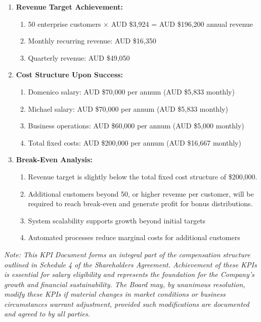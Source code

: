 \begin{enumerate}[label=\arabic*.]
\item \textbf{Revenue Target Achievement:}
    \begin{enumerate}[label=(\alph*)]
    \item 50 enterprise customers × AUD \$3,924 = AUD \$196,200 annual revenue
    \item Monthly recurring revenue: AUD \$16,350
    \item Quarterly revenue: AUD \$49,050
    \end{enumerate}

\item \textbf{Cost Structure Upon Success:}
    \begin{enumerate}[label=(\alph*)]
    \item Domenico salary: AUD \$70,000 per annum (AUD \$5,833 monthly)
    \item Michael salary: AUD \$70,000 per annum (AUD \$5,833 monthly)
    \item Business operations: AUD \$60,000 per annum (AUD \$5,000 monthly)
    \item Total fixed costs: AUD \$200,000 per annum (AUD \$16,667 monthly)
    \end{enumerate}

\item \textbf{Break-Even Analysis:}
    \begin{enumerate}[label=(\alph*)]
    \item Revenue target is slightly below the total fixed cost structure of \$200,000.
    \item Additional customers beyond 50, or higher revenue per customer, will be required to reach break-even and generate profit for bonus distributions.
    \item System scalability supports growth beyond initial targets
    \item Automated processes reduce marginal costs for additional customers
    \end{enumerate}
\end{enumerate}

\textit{Note: This KPI Document forms an integral part of the compensation structure outlined in Schedule 4 of the Shareholders Agreement. Achievement of these KPIs is essential for salary eligibility and represents the foundation for the Company's growth and financial sustainability. The Board may, by unanimous resolution, modify these KPIs if material changes in market conditions or business circumstances warrant adjustment, provided such modifications are documented and agreed to by all parties.} 


